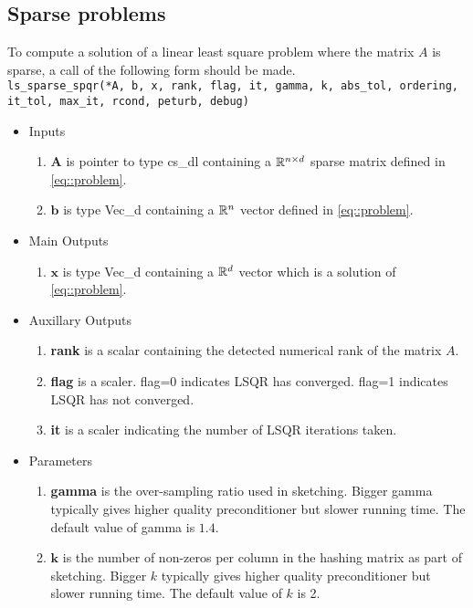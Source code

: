 \documentclass[english,11pt]{article}
\begin{document}
\subsection{Sparse problems}

To compute a solution of a linear least square problem where the matrix $A$ is sparse, a call of the following form should be made. \\

{\tt ls_sparse_spqr(*A, b, x, 
    rank, flag, it, gamma, k, abs_tol, ordering, it_tol, max_it, rcond, peturb, debug)}

	\begin{itemize}
	\setlength\itemsep{-0.5em}
	\item Inputs 
		\begin{enumerate}
			\item $\mathbf A$ is pointer to type cs_dl containing a $\mathbb{R}^{n \times d}$ sparse matrix defined in \eqref{eq::problem}.
			\item $\mathbf b$ is type Vec_d containing a $\mathbb{R}^n$ vector defined in \eqref{eq::problem}.
		\end{enumerate}
	
	\item Main Outputs
		\begin{enumerate}
			\item {$\mathbf x$} is type Vec_d containing a $\mathbb{R}^d$ vector which is a solution of \eqref{eq::problem}.
		\end{enumerate}

	\item Auxillary Outputs
		\begin{enumerate}
			\item {\bf rank} is a scalar containing the detected numerical rank of the matrix $A$. 
			\item {\bf flag} is a scaler. flag=0 indicates LSQR has converged. flag=1 indicates LSQR has not converged. 
			\item {\bf it} is a scaler indicating the number of LSQR iterations taken. 
		\end{enumerate}
		

	\item Parameters
		\begin{enumerate}
			\item {\bf gamma} is the over-sampling ratio used in sketching. Bigger gamma typically gives higher quality preconditioner but slower running time. The default value of gamma is $1.4$.

			\item $\mathbf k$ is the number of non-zeros per column in the hashing matrix as part of sketching. Bigger $k$ typically gives higher quality preconditioner but slower running time. The default value of $k$ is 2. 


\end{enumerate}
\end{itemize}
\end{document}
